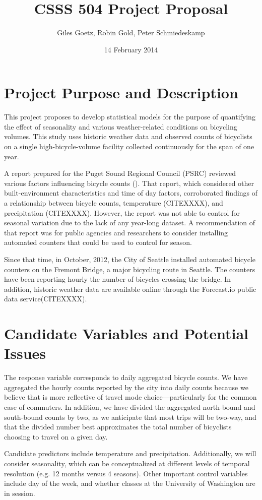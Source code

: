 \documentclass[12pt,letterpaper,article]{memoir} %
\title{CSSS 504 Project Proposal}
\author{Giles Goetz, Robin Gold, Peter Schmiedeskamp}
\date{14 February 2014} %
\begin{document}
\maketitle


\chapter*{Project Purpose and Description}
This project proposes to develop statistical models for the purpose of quantifying the effect of seasonality and various weather-related conditions on bicycling volumes.  This study uses historic weather data and observed counts of bicyclists on a single high-bicycle-volume facility collected continuously for the span of one year.

 A report prepared for the Puget Sound Regional Council (PSRC) reviewed various factors influencing bicycle counts (\cite{Ginger:2011aa}). That report, which considered other built-environment characteristics and time of day factors, corroborated findings of a relationship between bicycle counts, temperature (CITEXXXX), and precipitation (CITEXXXX). However, the report was not able to control for seasonal variation due to the lack of any year-long dataset. A recommendation of that report was for public agencies and researchers to consider installing automated counters that could be used to control for season.

Since that time, in October, 2012, the City of Seattle installed automated bicycle counters on the Fremont Bridge, a major bicycling route in Seattle. The counters have been reporting hourly the number of bicycles crossing the bridge. In addition, historic weather data are available online through the Forecast.io public data service(CITEXXXX).


\chapter*{Candidate Variables and Potential Issues}
The response variable corresponds to daily aggregated bicycle counts. We have aggregated the hourly counts reported by the city into daily counts because we believe that is more reflective of travel mode choice---particularly for the common case of commuters. In addition, we have divided the aggregated north-bound and south-bound counts by two, as we anticipate that most trips will be two-way, and that the divided number best approximates the total number of bicyclists choosing to travel on a given day.

Candidate predictors include temperature and precipitation. Additionally, we will consider seasonality, which can be conceptualized at different levels of temporal resolution (e.g. 12 months versus 4 seasons). Other important control variables include day of the week, and whether classes at the University of Washington are in session.
\end{document}
